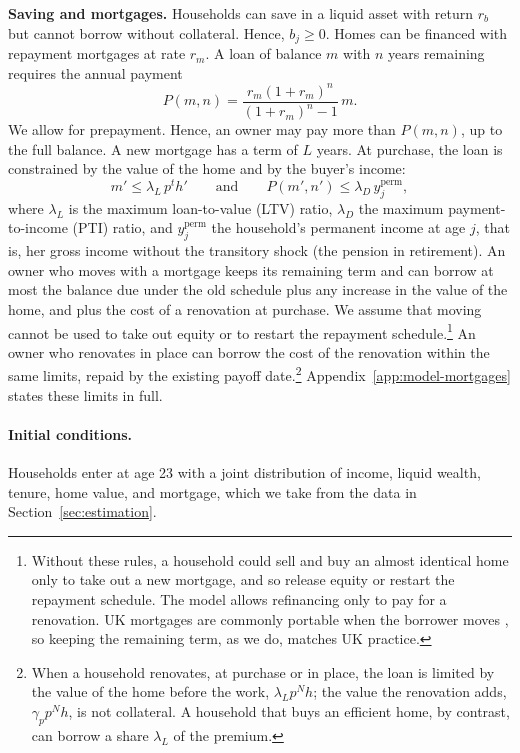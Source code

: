 \noindent
\textbf{Saving and mortgages.}
Households can  save in a liquid asset with return $r_b$ but cannot borrow
without collateral. Hence, $b_j\geq 0$. Homes can be financed with repayment
mortgages at rate $r_m$. A loan of balance $m$ with $n$ years remaining
requires the annual payment
\begin{equation}
  P(m,n)=\frac{r_m(1+r_m)^n}{(1+r_m)^n-1}\,m.
  \label{eq:mortgage-payment}
\end{equation}
We allow for prepayment. Hence, an owner may pay more than $P(m,n)$, up to the full balance. A new mortgage has a term of $L$ years. At purchase, the loan is constrained by the value of the home and by the buyer's income:
\begin{equation}
  m'\leq\lambda_L\,p^t h'
  \qquad\text{and}\qquad
  P(m',n')\leq\lambda_D\,y^{\mathrm{perm}}_j,
  \label{eq:ltv-pti}
\end{equation}
where $\lambda_L$ is the maximum loan-to-value (LTV) ratio, $\lambda_D$ the
maximum payment-to-income (PTI) ratio, and $y^{\mathrm{perm}}_j$ the household's
permanent income at age $j$, that is, her gross income without the transitory shock (the pension in retirement). An owner who moves with a mortgage keeps its
remaining term and can borrow at most the balance due under the old
schedule plus any increase in the value of the home, and plus the cost of a renovation at purchase. We assume that moving cannot be used
to take out equity or to restart the repayment
schedule.\footnote{Without these rules, a household could sell and buy an
almost identical home only to take out a new mortgage, and so release equity or restart the repayment schedule. The model allows refinancing only to pay for a renovation. UK mortgages are commonly
portable when the borrower moves \citep{liu2023longterm}, so keeping the remaining term, as we do, matches UK practice.} An owner who
renovates in place can borrow the cost of the renovation within the same
limits, repaid by the existing payoff date.\footnote{When a household renovates, at purchase
or in place, the loan is limited by the value of the home before the work,
$\lambda_Lp^Nh$; the value the renovation adds, $\gamma_pp^Nh$, is not
collateral. A household that buys an efficient home, by contrast, can
borrow a share $\lambda_L$ of the premium.}  Appendix~\ref{app:model-mortgages} states these limits in full.

\paragraph{Initial conditions.}
Households enter at age 23 with a joint distribution of income, liquid
wealth, tenure, home value, and mortgage, which we take from the data in
Section~\ref{sec:estimation}.

